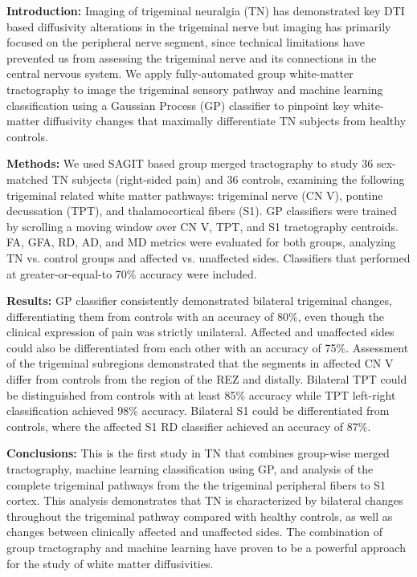 \textbf{Introduction:}  Imaging of trigeminal neuralgia (TN) has demonstrated key DTI based diffusivity alterations in the trigeminal nerve but imaging has primarily focused on the peripheral nerve segment, since technical limitations have  prevented us from assessing the trigeminal nerve and its connections in the central nervous system. We apply fully-automated group white-matter tractography to image the trigeminal sensory pathway and machine learning classification using a Gaussian Process (GP) classifier to pinpoint key white-matter diffusivity changes that maximally differentiate TN subjects from healthy controls. 

\textbf{Methods:} We used SAGIT based group merged tractography to study 36 sex-matched TN subjects (right-sided pain) and 36 controls, examining the following trigeminal related white matter pathways: trigeminal nerve (CN V), pontine decussation (TPT), and thalamocortical fibers (S1). GP classifiers were trained by scrolling a moving window over CN V, TPT, and S1 tractography centroids. FA, GFA, RD, AD, and MD metrics were evaluated for both groups, analyzing TN vs. control groups and affected vs. unaffected sides. Classifiers that performed at greater-or-equal-to 70\% accuracy were included.

\textbf{Results:} GP classifier consistently demonstrated bilateral trigeminal changes, differentiating them from controls with an accuracy of 80\%, even though the clinical expression of pain was strictly unilateral. Affected and unaffected sides could also be differentiated from each other with an accuracy of 75\%. Assessment of the trigeminal subregions demonstrated that the segments in affected CN V differ from controls from the region of the REZ and distally. Bilateral TPT could be distinguished from controls with at least 85\% accuracy while TPT left-right classification achieved 98\% accuracy. Bilateral S1 could be differentiated from controls, where the affected S1 RD classifier achieved an accuracy of 87\%.

\textbf{Conclusions:} This is the first study in TN that combines group-wise merged tractography, machine learning classification using GP, and analysis of the complete trigeminal pathways from the the trigeminal peripheral fibers to S1 cortex. This analysis demonstrates that TN is characterized by bilateral changes throughout the trigeminal pathway compared with healthy controls, as well as changes between clinically affected and unaffected sides. The combination of group tractography and machine learning have proven to be a powerful approach for the study of white matter diffusivities.